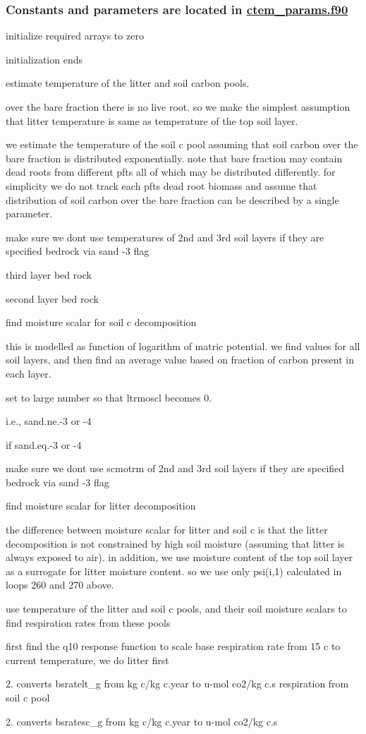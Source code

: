  \subsubsection*{Constants and parameters are located in \hyperlink{ctem__params_8f90}{ctem\+\_\+params.\+f90} }

initialize required arrays to zero

initialization ends

estimate temperature of the litter and soil carbon pools.

over the bare fraction there is no live root. so we make the simplest assumption that litter temperature is same as temperature of the top soil layer.

we estimate the temperature of the soil c pool assuming that soil carbon over the bare fraction is distributed exponentially. note that bare fraction may contain dead roots from different pfts all of which may be distributed differently. for simplicity we do not track each pft\textquotesingle{}s dead root biomass and assume that distribution of soil carbon over the bare fraction can be described by a single parameter.

make sure we don\textquotesingle{}t use temperatures of 2nd and 3rd soil layers if they are specified bedrock via sand -\/3 flag

third layer bed rock

second layer bed rock

find moisture scalar for soil c decomposition

this is modelled as function of logarithm of matric potential. we find values for all soil layers, and then find an average value based on fraction of carbon present in each layer.

set to large number so that ltrmoscl becomes 0.

i.\+e., sand.\+ne.-\/3 or -\/4

if sand.\+eq.-\/3 or -\/4

make sure we don\textquotesingle{}t use scmotrm of 2nd and 3rd soil layers if they are specified bedrock via sand -\/3 flag

find moisture scalar for litter decomposition

the difference between moisture scalar for litter and soil c is that the litter decomposition is not constrained by high soil moisture (assuming that litter is always exposed to air). in addition, we use moisture content of the top soil layer as a surrogate for litter moisture content. so we use only psi(i,1) calculated in loops 260 and 270 above.

use temperature of the litter and soil c pools, and their soil moisture scalars to find respiration rates from these pools

first find the q10 response function to scale base respiration rate from 15 c to current temperature, we do litter first

2. converts bsratelt\+\_\+g from kg c/kg c.\+year to u-\/mol co2/kg c.\+s respiration from soil c pool

2. converts bsratesc\+\_\+g from kg c/kg c.\+year to u-\/mol co2/kg c.\+s 
